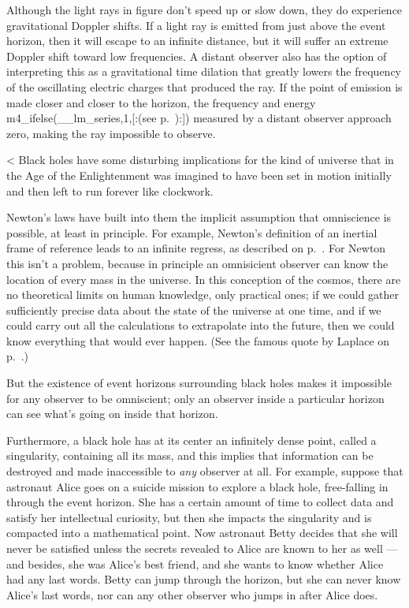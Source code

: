 Although the light rays in figure  don't speed up or slow down, they do
experience gravitational Doppler shifts.
If a light ray is emitted from just above the event horizon, then it will escape to an infinite distance, but
it will suffer an extreme Doppler shift toward low frequencies. A distant observer also has the option of interpreting this
as a gravitational time dilation that greatly lowers the frequency of the oscillating electric charges that produced the ray.
If the point of emission is made closer and closer to the horizon,
the frequency and energy m4_ifelse(__lm_series,1,[:(see p.~\pageref{light-wave-energy-doppler}):])
measured by a distant observer approach zero, making the ray impossible to observe.

<%
Black holes have some disturbing implications for the kind of  universe that in the Age of the Enlightenment was imagined
to have been set in motion initially and then left to run forever like clockwork. 

Newton's laws have built into them the implicit assumption that omniscience is possible, at least in principle. For example,
Newton's definition of an inertial frame of reference leads to an infinite regress, as described on p.~\pageref{inertial-frame-gr}.
For Newton this isn't a problem,
because in principle an omnisicient observer can know the location of every mass in the universe.
In this conception of the cosmos, there are no theoretical
limits on human knowledge, only practical ones; if we could gather sufficiently precise data about the state of the universe at one time,
and if we could carry out all the calculations to extrapolate into the future, then we could know everything that would ever happen.
(See the famous quote by Laplace on p.~\pageref{laplace-quote}.)

But the existence of event horizons surrounding black holes makes it impossible for any observer to be omniscient; only an observer inside
a particular horizon can see what's going on inside that horizon.

Furthermore, a black hole has at its center an infinitely dense
point, called a singularity, containing all its mass, and this implies that information can be destroyed and made inaccessible to \emph{any} observer at all.
For example, suppose that astronaut Alice goes on a suicide mission to explore a black hole, free-falling in through the event horizon.
She has a certain amount of time to collect data and satisfy her intellectual curiosity, but then she impacts the singularity and
is compacted into a mathematical point. Now astronaut Betty decides that she will never be satisfied unless the secrets revealed to Alice
are known to her as well --- and besides, she was Alice's best friend, and she wants to know whether Alice had any last words.
Betty can jump through the horizon, but she can never know Alice's last words, nor can any other observer who jumps 
in after Alice does.

